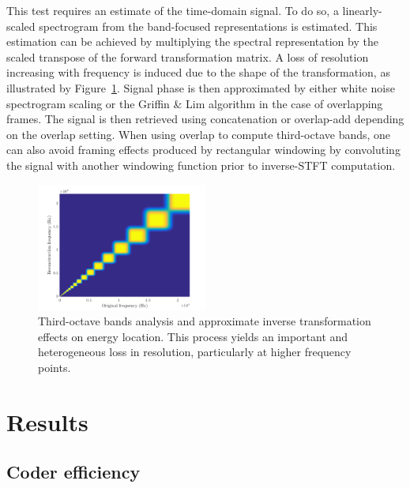 \documentclass[sensors,article,submit,moreauthors,pdftex,10pt,a4paper]{mdpi}
\begin{document}
This test requires an estimate of the time-domain signal. To do so, a linearly-scaled spectrogram from the band-focused representations is estimated. This estimation can be achieved by multiplying the spectral representation by the scaled transpose of the forward transformation matrix. A loss of resolution increasing with frequency is induced due to the shape of the transformation, as illustrated by Figure~\ref{fig:freq}. Signal phase is then approximated by either white noise spectrogram scaling or the Griffin \& Lim algorithm \cite{griffin1984} in the case of overlapping frames. The signal is then retrieved using concatenation or overlap-add depending on the overlap setting. When using overlap to compute third-octave bands, one can also avoid framing effects produced by rectangular windowing by convoluting the signal with another windowing function prior to inverse-STFT computation.

\begin{figure}[htbp]
	\centering
		\includegraphics[width=0.5\textwidth]{figures/freq.png}
	\caption{Third-octave bands analysis and approximate inverse transformation effects on energy location. This process yields an important and heterogeneous loss in resolution, particularly at higher frequency points.}
	\label{fig:freq}
\end{figure}



\section{Results} \label{sec:results}

\subsection{Coder efficiency}
\end{document}

